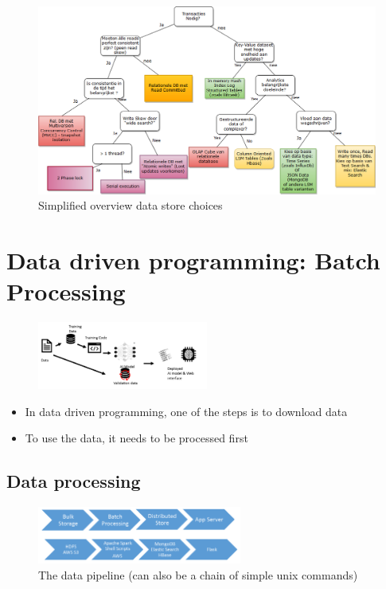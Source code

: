 \documentclass{article}
\begin{document}
\begin{figure}[H]
    \centering
    \includegraphics[width=\textwidth]{overview-datastores.png}
    \caption{Simplified overview data store choices}
\end{figure}

\section{Data driven programming: Batch Processing}

\begin{figure}[H]
    \centering
    \includegraphics[width=0.5\textwidth]{data-driven-programming.png}
\end{figure}

\begin{itemize}
    \item In data driven programming, one of the steps is to download data
    \item To use the data, it needs to be processed first
\end{itemize}

\subsection{Data processing}

\begin{figure}[H]
    \centering
    \includegraphics[width=0.6\textwidth]{data-pipeline.png}
    \caption{The data pipeline (can also be a chain of simple unix commands)}
\end{figure}
\end{document}
